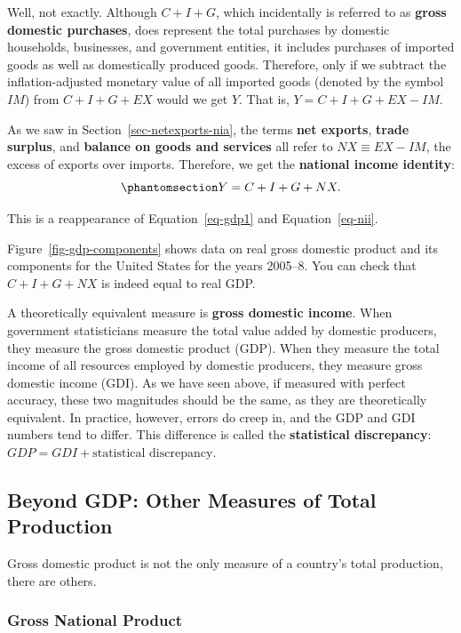 \documentclass[
  letterpaper,
]{book}
\theoremstyle{plain}
\theoremstyle{remark}
\begin{document}
Well, not exactly. Although \(C+I+G\), which incidentally is referred to
as \textbf{gross domestic purchases},
does represent the total purchases by domestic households, businesses,
and government entities, it includes purchases of imported goods as well
as domestically produced goods. Therefore, only if we subtract the
inflation-adjusted monetary value of all imported goods (denoted by the
symbol \(IM\)) from \(C+I+G+EX\) would we get \(Y\). That is,
\(Y=C+I+G+EX-IM\).

As we saw in Section~\ref{sec-netexports-nia}, the terms \textbf{net
exports}, \textbf{trade surplus}, and \textbf{balance on goods and
services} all refer to \(NX\equiv EX-IM\), the excess of exports over
imports. Therefore, we get the \textbf{national income
identity}:
\begin{equation}\phantomsection\label{eq-ni-identity}{
Y=C+I+G+NX.
}\end{equation}

This is a reappearance of Equation~\ref{eq-gdp1} and
Equation~\ref{eq-nii}.

Figure~\ref{fig-gdp-components} shows data on real gross domestic
product and its components for the United States for the years 2005--8.
You can check that \(C+I+G+NX\) is indeed equal to real GDP.

A theoretically equivalent measure is \textbf{gross domestic income}.
When government statisticians measure the total value added by domestic
producers, they measure the gross domestic product (GDP). When they
measure the total income of all resources employed by domestic
producers, they measure gross domestic income (GDI). As we have seen
above, if measured with perfect accuracy, these two magnitudes should be
the same, as they are theoretically equivalent. In practice, however,
errors do creep in, and the GDP and GDI numbers tend to differ. This
difference is called the \textbf{statistical discrepancy}:
\(GDP=GDI+\text{statistical discrepancy}\).

\subsection{Beyond GDP: Other Measures of Total
Production}\label{sec-beyond-gdp}

Gross domestic product is not the only measure of a country's total
production, there are others.

\subsubsection{Gross National Product}\label{sec-gnp}
\end{document}
